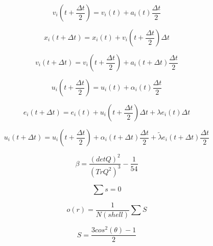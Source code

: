 \documentclass{article}
\begin{document}
	\begin{equation*}
		v_i(t+\frac{\Delta t}{2}) = v_i(t) + a_i(t)\frac{\Delta t}{2}
	\end{equation*}

	\begin{equation*}
		x_i(t+\Delta t) = x_i(t) + v_i(t+\frac{\Delta t}{2})\Delta t
	\end{equation*}
	
	\begin{equation*}
		v_i(t+\Delta t) = v_i(t+\frac{\Delta t}{2}) + a_i(t+\Delta t)\frac{\Delta t}{2}
	\end{equation*}

	\begin{equation*}
		u_i(t+\frac{\Delta t}{2}) = u_i(t) + \alpha_i(t)\frac{\Delta t}{2}
	\end{equation*}

	\begin{equation*}
		e_i(t+\Delta t) = e_i(t) + u_i(t + \frac{\Delta t}{2})\Delta t + \lambda e_i(t) \Delta t
	\end{equation*}

	\begin{equation*}
		u_i(t+\Delta t) = u_i(t+\frac{\Delta t}{2}) + \alpha_i(t+\Delta t)\frac{\Delta t}{2} + \tilde{\lambda} e_i(t+\Delta t)\frac{\Delta t}{2}
	\end{equation*}

	\begin{equation*}
		\beta = \frac{(detQ)^2}{(TrQ^2)^3} - \frac{1}{54}
	\end{equation*}

	\begin{equation*}
		\sum s = 0
	\end{equation*}

	\begin{equation*}
		o(r) = \frac{1}{N(shell)}\sum S
	\end{equation*}

	\begin{equation*}
		S = \frac{3cos^2(\theta)-1}{2}
	\end{equation*}
\end{document}
